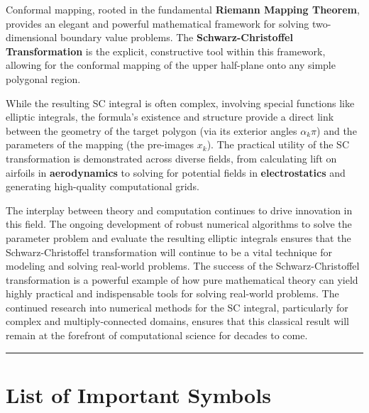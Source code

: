\documentclass[12pt,a4paper]{article}
\begin{document}
Conformal mapping, rooted in the fundamental \textbf{Riemann Mapping
Theorem}, provides an elegant and powerful mathematical framework for
solving two-dimensional boundary value problems. The
\textbf{Schwarz-Christoffel Transformation} is the explicit,
constructive tool within this framework, allowing for the conformal
mapping of the upper half-plane onto any simple polygonal region.

While the resulting SC integral is often complex, involving special
functions like elliptic integrals, the formula's existence and structure
provide a direct link between the geometry of the target polygon (via
its exterior angles \(\alpha_k \pi\)) and the parameters of the mapping
(the pre-images \(x_k\)). The practical utility of the SC transformation
is demonstrated across diverse fields, from calculating lift on airfoils
in \textbf{aerodynamics} to solving for potential fields in
\textbf{electrostatics} and generating high-quality computational grids.

The interplay between theory and computation continues to drive
innovation in this field. The ongoing development of robust numerical
algorithms to solve the parameter problem and evaluate the resulting
elliptic integrals ensures that the Schwarz-Christoffel transformation
will continue to be a vital technique for modeling and solving
real-world problems. The success of the Schwarz-Christoffel
transformation is a powerful example of how pure mathematical theory can
yield highly practical and indispensable tools for solving real-world
problems. The continued research into numerical methods for the SC
integral, particularly for complex and multiply-connected domains,
ensures that this classical result will remain at the forefront of
computational science for decades to come.

\begin{center}\rule{0.5\linewidth}{0.5pt}\end{center}

\newpage
\section*{List of Important Symbols}
\end{document}
